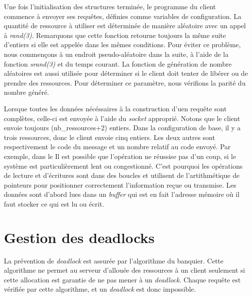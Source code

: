 \documentclass[letterpaper,12pt]{scrartcl}
\begin{document}
Une fois l'initialisation des structures terminée, le programme du client commence à envoyer ses requêtes, définies comme variables de configuration. La quantité de ressource à utiliser est déterminée de manière aléatoire avec un appel à \textit{rand(3)}. Remarquons que cette fonction retourne toujours la même suite d'entiers si elle est appelée dans les mêmes conditions. Pour éviter ce problème, nous commençons à un endroit pseudo-aléatoire dans la suite, à l'aide de la fonction \textit{srand(3)} et du temps courant. La fonction de génération de nombre aléatoires est aussi utilisée pour déterminer si le client doit tenter de libérer ou de prendre des ressources. Pour déterminer ce paramètre, nous vérifions la parité du nombre généré. 

Lorsque toutes les données nécéssaires à la construction d'uen requête sont complètes, celle-ci est envoyée à l'aide du \textit{socket} approprié. Notons que le client envoie toujours (nb_ressources+2) entiers. Dans la configuration de base, il y a trois ressources, donc le client envoie cinq entiers. Les deux autres sont respectivement le code du message et un nombre relatif au code envoyé. Par exemple, dans le  Il est possible que l'opération ne réussise pas d'un coup, si le système est particulièrement lent ou congestionné. C'est pourquoi les opérations de lecture et d'écritures sont dans des boucles et utilisent de l'artithmétique de pointeurs pour positionner correctement l'information reçue ou transmise. Les données sont d'abord lues dans un \textit{buffer} qui est en fait l'adresse mémoire où il faut stocker ce qui est lu ou écrit.
\section{Gestion des deadlocks}
La prévention de \emph{deadlock} est assurée par l'algorithme du banquier.
Cette algorithme ne permet au serveur d'allouée des ressources à un client seulement si cette allocation est garantie de ne pas mener à un \emph{deadlock}.
Chaque requête est vérifiée par cette algorithme, et un \emph{deadlock} est donc impossible.
\end{document}

